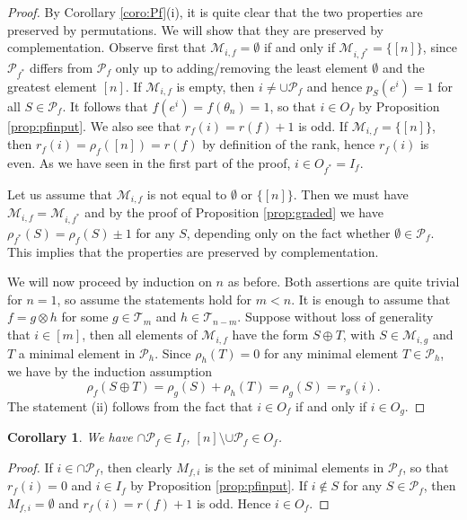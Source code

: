 \documentclass[12pt]{article}
\newtheorem{coro}{Corollary}
\theoremstyle{definition}
\theoremstyle{remark}
\def\Me{\mathcal M}
\def\Te{\mathcal T}
\def\Pe{\mathcal P}
\begin{document}
\begin{proof} By Corollary \ref{coro:Pf}(i),  it is
quite clear that the two properties are preserved by permutations. We will show that they
are preserved by complementation. Observe first that $\Me_{i,f}=\emptyset$ if and only if
$\Me_{i,f^*}=\{[n]\}$, since $\Pe_{f^*}$ differs from $\Pe_f$ only up to adding/removing the
least element $\emptyset$ and the greatest element $[n]$. If $\Me_{i,f}$ is empty, then
$i\ne \cup\Pe_f$ and hence $p_S(e^i)=1$ for all $S\in
\Pe_f$. It follows that $f(e^i)=f(\theta_n)=1$, so that  $i\in O_f$  by Proposition
\ref{prop:pfinput}. We also see that $r_f(i)=r(f)+1$ is odd.
If $\Me_{i,f}=\{[n]\}$, then $r_f(i)=\rho_f([n])=r(f)$ by definition of the rank, hence
$r_{f}(i)$ is even. As we have seen in the first part of the proof, $i\in O_{f^*}=I_f$. 

Let us assume that $\Me_{i,f}$ is not equal to $\emptyset$ or $\{[n]\}$. Then we must have
$\Me_{i,f}=\Me_{i,f^*}$ and by the
proof of Proposition \ref{prop:graded} we have  
$\rho_{f^*}(S)=\rho_f(S)\pm 1$ for any $S$, depending only on the fact whether $\emptyset
\in \Pe_f$. This implies that the properties are preserved by complementation.  


We will now proceed by induction on $n$ as before. Both  assertions are quite trivial for $n=1$,
so assume the statements hold for $m<n$. It is enough to assume that
$f=g\otimes h$ for some $g\in \Te_m$ and $h\in \Te_{n-m}$. 
Suppose without loss of generality that $i\in [m]$, then all elements of $\Me_{i,f}$ have
the form $S\oplus T$, with $S\in \Me_{i,g}$ and  $T$ a minimal element in $\Pe_h$. 
 Since $\rho_h(T)=0$ for any minimal element $T\in \Pe_h$, we have
by the induction assumption
\[
\rho_f(S\oplus T)=\rho_g(S)+\rho_h(T)=\rho_g(S)= r_g(i).
\]
The statement (ii) follows from the fact that $i\in O_f$ if and only if $i\in O_g$.


\end{proof}

\begin{coro}\label{coro:free} We have $\cap{\Pe_f}\in I_f$, $[n]\setminus\cup{\Pe_f}\in O_f$.

\end{coro}

\begin{proof} If $i\in \cap\Pe_f$, then clearly $M_{f,i}$ is the set of minimal elements
in $\Pe_f$, so that $r_f(i)=0$ and $i\in I_f$ by Proposition \ref{prop:pfinput}. If
$i\notin S$ for any $S\in \Pe_f$, then $M_{f,i}=\emptyset$ and $r_f(i)=r(f)+1$ is odd.
Hence $i\in O_f$. 

\end{proof}
\end{document}
